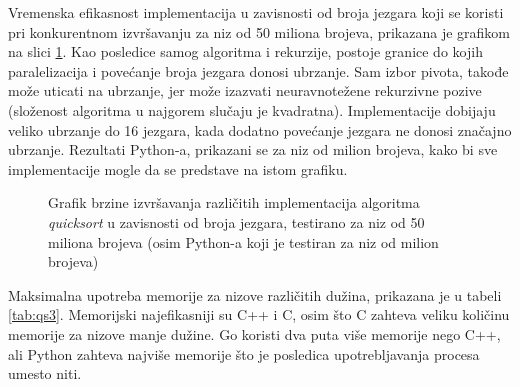 \documentclass[12pt,oneside]{memoir}
\begin{document}
Vremenska efikasnost implementacija u zavisnosti od broja jezgara koji se koristi pri konkurentnom izvršavanju za niz od 50 miliona brojeva, prikazana je grafikom na slici \ref{fig:qs1}. Kao posledice samog algoritma i rekurzije, postoje granice do kojih paralelizacija i povećanje broja jezgara donosi ubrzanje. Sam izbor pivota, takođe može uticati na ubrzanje, jer može izazvati neuravnotežene rekurzivne pozive (složenost algoritma u najgorem slučaju je kvadratna). Implementacije dobijaju veliko ubrzanje do 16 jezgara, kada dodatno povećanje jezgara ne donosi značajno ubrzanje. Rezultati Python-a, prikazani se za niz od milion brojeva, kako bi sve implementacije mogle da se predstave na istom grafiku.

\begin{figure}
\begin{center}


\caption{Grafik brzine izvršavanja različitih implementacija algoritma \textit{quicksort} u zavisnosti od broja jezgara, testirano za niz od 50 miliona brojeva (osim Python-a koji je testiran za niz od milion brojeva)}
\label{fig:qs1}
\end{center}
\end{figure}

Maksimalna upotreba memorije za nizove različitih dužina, prikazana je u tabeli \ref{tab:qs3}. Memorijski najefikasniji su C++ i C, osim što C zahteva veliku količinu memorije za nizove manje dužine. Go koristi dva puta više memorije nego C++, ali Python zahteva najviše memorije što je posledica upotrebljavanja procesa umesto niti. 
\end{document}
